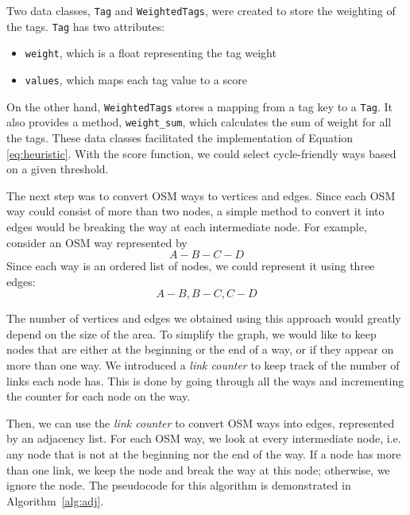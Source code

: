 \documentclass[12pt,a4paper]{report}
\begin{document}
Two data classes, \texttt{Tag} and \texttt{WeightedTags}, were created to store the weighting of the tags. \texttt{Tag} has two attributes:
\begin{itemize}
    \item \texttt{weight}, which is a float representing the tag weight
    \item \texttt{values}, which maps each tag value to a score
\end{itemize}

On the other hand, \texttt{WeightedTags} stores a mapping from a tag key to a \texttt{Tag}. It also provides a method, \texttt{weight\_sum}, which calculates the sum of weight for all the tags. These data classes facilitated the implementation of Equation \ref{eq:heuristic}. With the score function, we could select cycle-friendly ways based on a given threshold.

The next step was to convert OSM ways to vertices and edges. Since each OSM way could consist of more than two nodes, a simple method to convert it into edges would be breaking the way at each intermediate node. For example, consider an OSM way represented by
\[A - B - C - D\]
Since each way is an ordered list of nodes, we could represent it using three edges:
\[A - B, B - C, C - D\]

The number of vertices and edges we obtained using this approach would greatly depend on the size of the area. To simplify the graph, we would like to keep nodes that are either at the beginning or the end of a way, or if they appear on more than one way. We introduced a \textit{link counter} to keep track of the number of links each node has. This is done by going through all the ways and incrementing the counter for each node on the way.

Then, we can use the \textit{link counter} to convert OSM ways into edges, represented by an adjacency list. For each OSM way, we look at every intermediate node, i.e. any node that is not at the beginning nor the end of the way. If a node has more than one link, we keep the node and break the way at this node; otherwise, we ignore the node. The pseudocode for this algorithm is demonstrated in Algorithm~\ref{alg:adj}.
\end{document}
